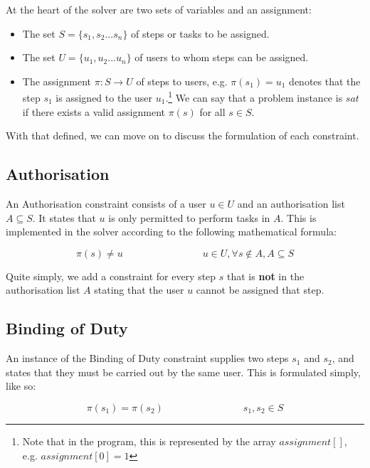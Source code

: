 \documentclass[11pt]{article}
\begin{document}
		At the heart of the solver are two sets of variables and an assignment:

		\begin{itemize}
			\item The set \(S = \{s_1, s_2... s_n\}\) of steps or tasks to be assigned.
			\item The set \(U = \{u_1, u_2... u_n\}\) of users to whom steps can be assigned.
			\item The assignment \(\pi : S \rightarrow U\) of steps to users, e.g. \(\pi(s_1) = u_1\) denotes that the step \(s_1\) is assigned to the user \(u_1\).\footnote{Note that in the program, this is represented by the array \(assignment[]\), e.g. \(assignment[0]=1\)} We can say that a problem instance is \(sat\) if there exists a valid assignment \(\pi(s)\) for all \(s \in S\).
		\end{itemize}

		With that defined, we can move on to discuss the formulation of each constraint.

		\subsection{Authorisation}

			An Authorisation constraint consists of a user \(u \in U\) and an authorisation list \(A \subseteq S\).
			It states that \(u\) is only permitted to perform tasks in \(A\).
			This is implemented in the solver according to the following mathematical formula:

			\begin{equation}
				\pi(s) \neq u \qquad \qquad \qquad \qquad u \in U, \forall s \notin A, A \subseteq S
			\end{equation}

			Quite simply, we add a constraint for every step \(s\) that is \textbf{not} in the authorisation list \(A\)
			stating that the user \(u\) cannot be assigned that step.

		\subsection{Binding of Duty}

			An instance of the Binding of Duty constraint supplies two steps \(s_1\) and \(s_2\),
			and states that they must be carried out by the same user.
			This is formulated simply, like so:

			\begin{equation}
				\pi(s_1) = \pi(s_2) \qquad \qquad \qquad \qquad s_1, s_2 \in S
			\end{equation}
\end{document}

